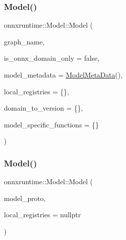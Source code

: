 \subsubsection{\texorpdfstring{Model()}{Model()}\hspace{0.1cm}{\footnotesize\ttfamily [1/3]}}
{\footnotesize\ttfamily onnxruntime\+::\+Model\+::\+Model (\begin{DoxyParamCaption}\item[{const std\+::string \&}]{graph\+\_\+name,  }\item[{bool}]{is\+\_\+onnx\+\_\+domain\+\_\+only = {\ttfamily false},  }\item[{const \mbox{\hyperlink{namespaceonnxruntime_a13519c21da77ccc594726b670276a266}{Model\+Meta\+Data}} \&}]{model\+\_\+metadata = {\ttfamily \mbox{\hyperlink{namespaceonnxruntime_a13519c21da77ccc594726b670276a266}{Model\+Meta\+Data}}()},  }\item[{const \mbox{\hyperlink{namespaceonnxruntime_a37a91305e7190e83fa9c66117a6a4746}{I\+Onnx\+Runtime\+Op\+Schema\+Registry\+List}}}]{local\+\_\+registries = {\ttfamily \{\}},  }\item[{const std\+::unordered\+\_\+map$<$ std\+::string, int $>$ \&}]{domain\+\_\+to\+\_\+version = {\ttfamily \{\}},  }\item[{const std\+::vector$<$ O\+N\+N\+X\+\_\+\+N\+A\+M\+E\+S\+P\+A\+C\+E\+::\+Function\+Proto $>$ \&}]{model\+\_\+specific\+\_\+functions = {\ttfamily \{\}} }\end{DoxyParamCaption})\hspace{0.3cm}{\ttfamily [explicit]}}

\mbox{\label{classonnxruntime_1_1Model_a9c173259b1fbf481bd9dfdecbd34f7f0}} 
\subsubsection{\texorpdfstring{Model()}{Model()}\hspace{0.1cm}{\footnotesize\ttfamily [2/3]}}
{\footnotesize\ttfamily onnxruntime\+::\+Model\+::\+Model (\begin{DoxyParamCaption}\item[{const O\+N\+N\+X\+\_\+\+N\+A\+M\+E\+S\+P\+A\+C\+E\+::\+Model\+Proto \&}]{model\+\_\+proto,  }\item[{const \mbox{\hyperlink{namespaceonnxruntime_a37a91305e7190e83fa9c66117a6a4746}{I\+Onnx\+Runtime\+Op\+Schema\+Registry\+List}} $\ast$}]{local\+\_\+registries = {\ttfamily nullptr} }\end{DoxyParamCaption})\hspace{0.3cm}{\ttfamily [explicit]}}

